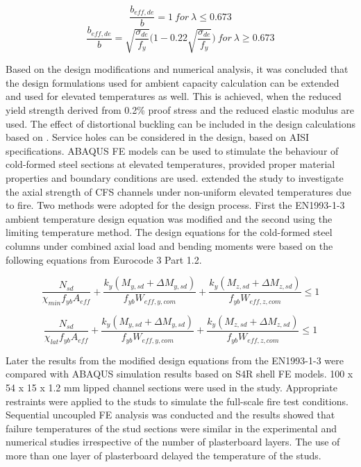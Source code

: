 \begin{equation}
\dfrac{b_{eff,de}}{b}= 1~for~\lambda \leq 0.673
\end{equation}
\begin{equation}
\dfrac{b_{eff,de}}{b}= \sqrt{\dfrac{\sigma_{de}}{f_y}}\bigg(1-0.22\sqrt{\dfrac{\sigma_{de}}{f_y}}\bigg)~for~\lambda \geq 0.673
\end{equation}

Based on the design modifications and numerical analysis, it was concluded that the design formulations used for ambient capacity calculation can be extended and used for elevated temperatures as well. This is achieved, when the reduced yield strength derived from 0.2\% proof stress and the reduced elastic modulus are used. The effect of distortional buckling can be included in the design calculations based on \citet{Young1992}. Service holes can be considered in the design, based on AISI specifications. ABAQUS FE models can be used to stimulate the behaviour of cold-formed steel sections at elevated temperatures, provided proper material properties and boundary conditions are used. \citet{Feng2003} extended the study to investigate the axial strength of CFS channels under non-uniform elevated temperatures due to fire. Two methods were adopted for the design process. First the EN1993-1-3 ambient temperature design equation was modified and the second using the limiting temperature method. The design equations for the cold-formed steel columns under combined axial load and bending moments were based on the following equations from Eurocode 3 Part 1.2.

\begin{equation}
\dfrac{N_{sd}}{\chi_{min}f_{yb}A_{eff}}+\dfrac{k_y(M_{y,sd}+\Delta M_{y,sd})}{f_{yb}W_{eff,y,com}}+\dfrac{k_y(M_{z,sd}+\Delta M_{z,sd})}{f_{yb}W_{eff,z,com}} \leq 1
\end{equation}

\begin{equation}
\dfrac{N_{sd}}{\chi_{lat}f_{yb}A_{eff}}+\dfrac{k_y(M_{y,sd}+\Delta M_{y,sd})}{f_{yb}W_{eff,y,com}}+\dfrac{k_y(M_{z,sd}+\Delta M_{z,sd})}{f_{yb}W_{eff,z,com}} \leq 1
\end{equation}

Later the results from the modified design equations from the EN1993-1-3 were compared with ABAQUS simulation results based on S4R shell FE models. 100 x 54 x 15 x 1.2 mm lipped channel sections were used in the study. Appropriate restraints were applied to the studs to simulate the full-scale fire test conditions. Sequential uncoupled FE analysis was conducted and the results showed that failure temperatures of the stud sections were similar in the experimental and numerical studies irrespective of the number of plasterboard layers. The use of more than one layer of plasterboard delayed the temperature of the studs. 

